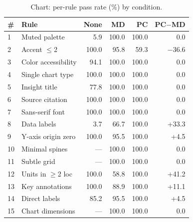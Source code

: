 \documentclass[sigconf,nonacm]{acmart}
\begin{document}
\begin{table}[h]
\caption{Chart: per-rule pass rate (\%) by condition.}
\label{tab:per-rule-chart}
\centering\small
\begin{tabular}{llrrrr}
\toprule
\textbf{\#} & \textbf{Rule} & \textbf{None} & \textbf{MD} & \textbf{PC} & \textbf{PC$-$MD} \\
\midrule
1  & Muted palette        &   5.9 & 100.0 & 100.0 &    0.0 \\
2  & Accent $\leq$2       & 100.0 &  95.8 &  59.3 & $-$36.6 \\
3  & Color accessibility  &  94.1 & 100.0 & 100.0 &    0.0 \\
4  & Single chart type    & 100.0 & 100.0 & 100.0 &    0.0 \\
5  & Insight title        &  77.8 & 100.0 & 100.0 &    0.0 \\
6  & Source citation      & 100.0 & 100.0 & 100.0 &    0.0 \\
7  & Sans-serif font      & 100.0 & 100.0 & 100.0 &    0.0 \\
8  & Data labels          &   3.7 &  66.7 & 100.0 &  +33.3 \\
9  & Y-axis origin zero   & 100.0 &  95.5 & 100.0 &   +4.5 \\
10 & Minimal spines       &  ---  & 100.0 & 100.0 &    0.0 \\
11 & Subtle grid          &  ---  & 100.0 & 100.0 &    0.0 \\
12 & Units in $\geq$2 loc & 100.0 &  58.8 & 100.0 &  +41.2 \\
13 & Key annotations      & 100.0 &  88.9 & 100.0 &  +11.1 \\
14 & Direct labels        &  85.2 &  95.5 & 100.0 &   +4.5 \\
15 & Chart dimensions     &  ---  & 100.0 & 100.0 &    0.0 \\
\bottomrule
\end{tabular}
\end{table}
\end{document}
